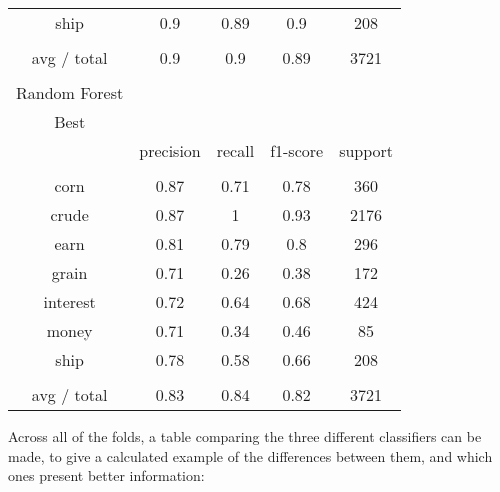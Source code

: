 \documentclass[11pt]{article}
\begin{document}
\begin{table}[h]
\begin{tabular}{| c | c | c | c | c |}
ship          & 0.9       & 0.89   & 0.9      & 208     \\
             &           &        &          &         \\
avg / total   & 0.9       & 0.9    & 0.89     & 3721    \\
             &           &        &          &         \\
Random Forest &           &        &          &         \\
Best          &           &        &          &         \\
             & precision & recall & f1-score & support \\
             &           &        &          &         \\
corn          & 0.87      & 0.71   & 0.78     & 360     \\
crude         & 0.87      & 1      & 0.93     & 2176    \\
earn          & 0.81      & 0.79   & 0.8      & 296     \\
grain         & 0.71      & 0.26   & 0.38     & 172     \\
interest      & 0.72      & 0.64   & 0.68     & 424     \\
money         & 0.71      & 0.34   & 0.46     & 85      \\
ship          & 0.78      & 0.58   & 0.66     & 208     \\
             &           &        &          &         \\
avg / total   & 0.83      & 0.84   & 0.82     & 3721  
\end{tabular}
\end{table}

Across all of the folds, a table comparing the three different classifiers can be made, to give a calculated example of the differences between them, and which ones present better information:
\end{document}
